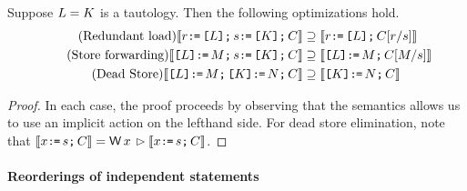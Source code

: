 \begin{lemma}
  Suppose $L=K$ is a tautology.  Then the following optimizations hold.
\begin{align*}
  \tag{Redundant load}
  \llbracket r \texttt{:}\mkern-1mu\texttt{=}\, \texttt{[}L\texttt{]} \texttt{;}\, s \texttt{:}\mkern-1mu\texttt{=}\, \texttt{[}K\texttt{]}  \texttt{;}\, C\rrbracket &\supseteq
  \llbracket r \texttt{:}\mkern-1mu\texttt{=}\, \texttt{[}L\texttt{]} \texttt{;}\, C[r/s]\rrbracket \\
  \tag{Store forwarding} 
  \llbracket\texttt{[}L\texttt{]} \texttt{:}\mkern-1mu\texttt{=}\, M \texttt{;}\, s \texttt{:}\mkern-1mu\texttt{=}\, \texttt{[}K\texttt{]} \texttt{;}\, C\rrbracket &\supseteq 
  \llbracket\texttt{[}L\texttt{]} \texttt{:}\mkern-1mu\texttt{=}\, M \texttt{;}\, C[M/s]\rrbracket \\
  \tag{Dead Store} 
  \llbracket\texttt{[}L\texttt{]} \texttt{:}\mkern-1mu\texttt{=}\, M \texttt{;}\, \texttt{[}K\texttt{]} \texttt{:}\mkern-1mu\texttt{=}\, N \texttt{;}\, C\rrbracket &\supseteq 
  \llbracket\texttt{[}K\texttt{]} \texttt{:}\mkern-1mu\texttt{=}\, N \texttt{;}\, C\rrbracket
\end{align*}
\begin{proof}
  In each case, the proof proceeds by observing that the semantics allows us
  to use an implicit action on the lefthand side.  For dead store
  elimination, note that
  $\sem{\aLoc \GETS \bReg \SEMI \aCmd} = \DW{\aLoc}{} \guard \sem{\aLoc \GETS
    \bReg \SEMI \aCmd}$.
\end{proof}
\end{lemma}
  
\paragraph*{Reorderings of independent statements}

